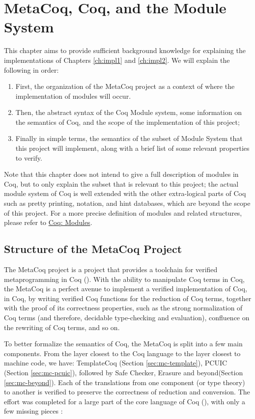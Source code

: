 \chapter{MetaCoq, Coq, and the Module System}
\label{ch:coq}

This chapter aims to provide sufficient background knowledge for explaining the
implementations of Chapters \ref{ch:impl1} and \ref{ch:impl2}. We will explain
the following in order:

\begin{enumerate}
    \item First, the organization of the MetaCoq project as a context of where
    the implementation of modules will occur.
    \item Then, the abstract syntax of the Coq Module system, some information
    on the semantics of Coq, and the scope of the implementation of this
    project;
    \item Finally in simple terms, the semantics of the subset of Module System
    that this project will implement, along with a brief list of some relevant
    properties to verify.
\end{enumerate}

Note that this chapter does not intend to give a full description of modules in
Coq, but to only explain the subset that is relevant to this project; the actual
module system of Coq is well extended with the other extra-logical parts of Coq
such as pretty printing, notation, and hint databases, which are beyond the
scope of this project. For a more precise definition of modules and related
structures, please refer to
\href{https://coq.inria.fr/refman/language/core/modules.html}{Coq: Modules}.

\section{Structure of the MetaCoq Project}
\label{sec:metacoq}
The MetaCoq project is a project that provides a toolchain for verified
metaprogramming in Coq (\cite{sozeau2020metacoq}). With the ability to manipulate
Coq terms in Coq, the MetaCoq is a perfect avenue to implement a verified
implementation of Coq, in Coq, by writing verified Coq functions for the
reduction of Coq terms, together with the proof of its correctness properties,
such as the strong normalization of Coq terms (and therefore, decidable
type-checking and evaluation), confluence on the rewriting of Coq terms, and so
on. 

To better formalize the semantics of Coq, the MetaCoq is split into a few main
components. From the layer closest to the Coq language to the layer closest to
machine code, we have: TemplateCoq (Section \ref{sec:mc-template}), PCUIC
(Section \ref{sec:mc-pcuic}), followed by Safe Checker, Erasure and
beyond(Section \ref{sec:mc-beyond}). Each of the translations from one component
(or type theory) to another is verified to preserve the correctness of reduction
and conversion. The effort was completed for a large part of the core language
of Coq (\cite{coqcoqcorrect}), with only a few missing pieces :

